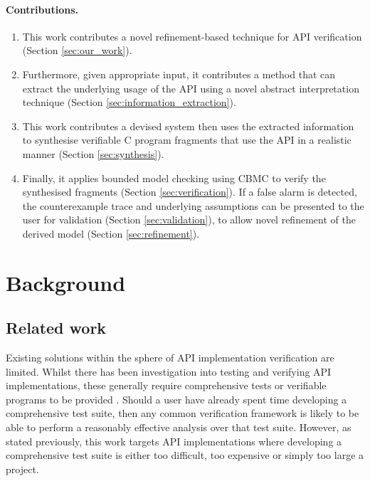 \documentclass[EPiC]{easychair}
\begin{document}
\paragraph{Contributions.}    

\begin{enumerate}[label=(\alph*)]
	\item This work contributes a novel refinement-based technique for API verification (Section \ref{sec:our_work}).
	\item  Furthermore, given appropriate input, it contributes a method that can extract the underlying usage of the API using a novel abstract interpretation technique (Section \ref{sec:information_extraction}). 
	\item This work contributes a devised system then uses the extracted information to synthesise verifiable C program fragments that use the API in a realistic manner (Section \ref{sec:synthesis}). 
	\item Finally, it applies bounded model checking using CBMC to verify the synthesised fragments (Section \ref{sec:verification}).  If a false alarm is detected, the counterexample trace and underlying assumptions can be presented to the user for validation (Section \ref{sec:validation}), to allow novel refinement of the derived model (Section \ref{sec:refinement}).   
\end{enumerate}


\section{Background}
\label{sect:related_work}

\subsection{Related work}
Existing solutions within the sphere of API implementation verification are limited.  Whilst there has been investigation into testing and verifying API implementations, these generally require comprehensive tests or verifiable programs to be provided \cite{DBLP:conf/dsn/SheltonKD00}.  Should a user have already spent time developing a comprehensive test suite, then any common verification framework is likely to be able to perform a reasonably effective analysis over that test suite.   However, as stated previously, this work targets API implementations where developing a comprehensive test suite is either too difficult, too expensive or simply too large a project. 
\end{document}
